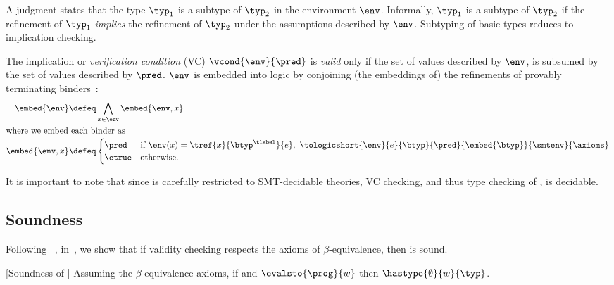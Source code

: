 A judgment  states
that the type $\typ_1$ is a subtype of %
$\typ_2$ in the environment $\env$.
%
Informally, $\typ_1$ is a subtype of $\typ_2$ if
the refinement of $\typ_1$ \emph{implies}
the refinement of $\typ_2$
under the assumptions described by $\env$.
%
Subtyping of basic types reduces to implication checking.

The implication or \emph{verification condition} (VC)
${\vcond{\env}{\pred}}$
is \emph{valid} only if the set of values
described by $\env$, is subsumed by
the set of values described by $\pred$.
%
$\env$ is embedded into logic by conjoining
(the embeddings of) the refinements of
provably terminating binders~\cite{Vazou14}:
%
\begin{align*}
\embed{\env} \defeq & \bigwedge_{x \in \env} \embed{\env, x} \\
\intertext{where we embed each binder as}
\embed{\env, x} \defeq & \begin{cases}
                           \pred  & \text{if } \env(x)=\tref{x}{\btyp^{\tlabel}}{e},\
                                    \tologicshort{\env}{e}{\btyp}{\pred}{\embed{\btyp}}{\smtenv}{\axioms} \\
                           \etrue & \text{otherwise}.
                         \end{cases}
\end{align*}


It is important to note that since \smtlan
is carefully restricted to SMT-decidable theories,
VC checking, and thus type checking of \corelan, is decidable.

\subsection{Soundness}

Following \undeclang~\citep{Vazou14}, in~\citep{appendix}, we show that
if validity checking respects the axioms of $\beta$-equivalence,
then \corelan is sound.

%
\begin{theorem}{[Soundness of \corelan]}\label{thm:safety}
Assuming the $\beta$-equivalence axioms,
if \hastype{\emptyset}{\prog}{\typ}
       and $\evalsto{\prog}{w}$ then $\hastype{\emptyset}{w}{\typ}$.
\end{theorem}

